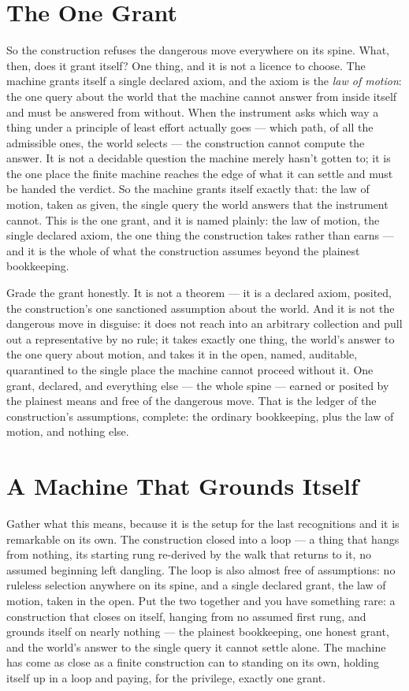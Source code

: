\section{The One Grant}

So the construction refuses the dangerous move everywhere on its spine. What, then, does it grant itself? One
thing, and it is not a licence to choose. The machine grants itself a single declared axiom, and the axiom is the
\emph{law of motion}: the one query about the world that the machine cannot answer from inside itself and must be
answered from without. When the instrument asks which way a thing under a principle of least effort actually
goes --- which path, of all the admissible ones, the world selects --- the construction cannot compute the answer.
It is not a decidable question the machine merely hasn't gotten to; it is the one place the finite machine reaches
the edge of what it can settle and must be handed the verdict. So the machine grants itself exactly that: the law
of motion, taken as given, the single query the world answers that the instrument cannot. This is the one grant,
and it is named plainly: the law of motion, the single declared axiom, the one thing the construction
takes rather than earns --- and it is the whole of what the construction assumes beyond the plainest bookkeeping.

Grade the grant honestly. It is not a theorem --- it is a declared axiom, posited, the construction's one
sanctioned assumption about the world. And it is not the dangerous move in disguise: it does not reach into an
arbitrary collection and pull out a representative by no rule; it takes exactly one thing, the world's answer to
the one query about motion, and takes it in the open, named, auditable, quarantined to the single place the
machine cannot proceed without it. One grant, declared, and everything else --- the whole spine --- earned or
posited by the plainest means and free of the dangerous move. That is the ledger of the construction's
assumptions, complete: the ordinary bookkeeping, plus the law of motion, and nothing else.

\section{A Machine That Grounds Itself}

Gather what this means, because it is the setup for the last recognitions and it is remarkable on its own.
The construction closed into a loop --- a thing that hangs from nothing, its starting rung
re-derived by the walk that returns to it, no assumed beginning left dangling. The loop is also almost free of
assumptions: no ruleless selection anywhere on its spine, and a single declared grant, the law of
motion, taken in the open. Put the two together and you have something rare: a construction that closes on itself,
hanging from no assumed first rung, and grounds itself on nearly nothing --- the plainest bookkeeping, one honest
grant, and the world's answer to the single query it cannot settle alone. The machine has come as close as a
finite construction can to standing on its own, holding itself up in a loop and paying, for the privilege, exactly
one grant.

